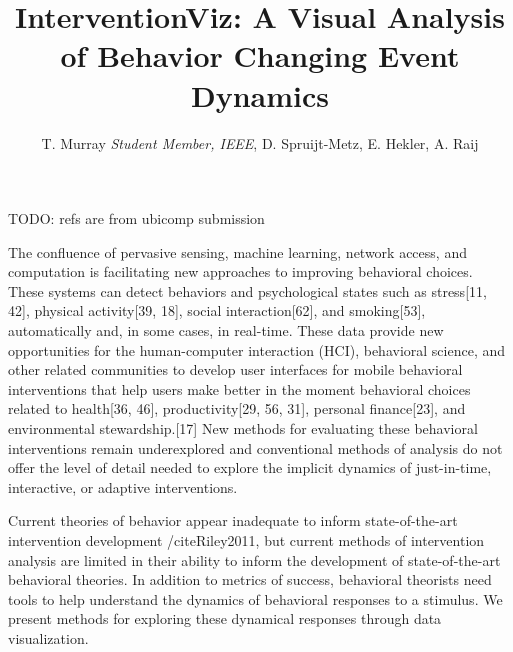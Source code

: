 \documentclass[preprint,journal]{vgtc}       %
\title{InterventionViz: A Visual Analysis of Behavior Changing Event Dynamics}
\author{T. Murray \textit{Student Member, IEEE}, D. Spruijt-Metz, E. Hekler, A. Raij}
\begin{document}


\maketitle


TODO: refs are from ubicomp submission

The confluence of pervasive sensing, machine learning, network access, and computation is facilitating new approaches to improving behavioral choices. These systems can detect behaviors and psychological states such as stress[11, 42], physical activity[39, 18], social interaction[62], and smoking[53], automatically and, in some cases, in real-time.
These data provide new opportunities for the human-computer interaction (HCI), behavioral science, and other related communities to develop user interfaces for mobile behavioral interventions that help users make better in the moment behavioral choices related to health[36, 46], productivity[29, 56, 31], personal finance[23], and environmental stewardship.[17] 
New methods for evaluating these behavioral interventions remain underexplored and conventional methods of analysis do not offer the level of detail needed to explore the implicit dynamics of just-in-time, interactive, or adaptive interventions.

Current theories of behavior appear inadequate to inform state-of-the-art intervention development /cite{Riley2011}, but current methods of intervention analysis are limited in their ability to inform the development of state-of-the-art behavioral theories. 
In addition to metrics of success, behavioral theorists need tools to help understand the dynamics of behavioral responses to a stimulus. 
We present methods for exploring these dynamical responses through data visualization.
\end{document}
